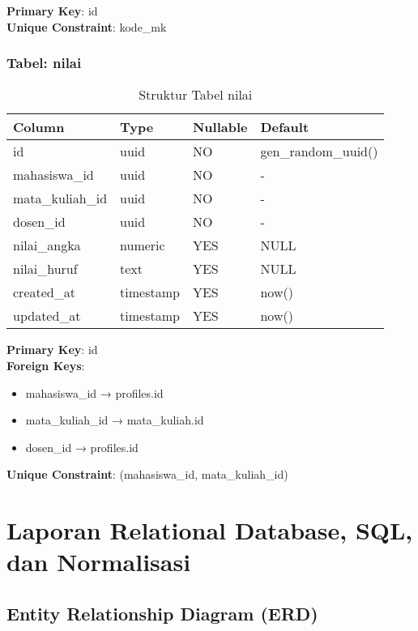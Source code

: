 \documentclass[12pt,a4paper]{article}
\begin{document}
\textbf{Primary Key}: id\\
\textbf{Unique Constraint}: kode\_mk

\subsubsection{Tabel: nilai}

\begin{table}[H]
\centering
\begin{tabular}{|l|l|l|l|}
\hline
\textbf{Column} & \textbf{Type} & \textbf{Nullable} & \textbf{Default} \\
\hline
id & uuid & NO & gen\_random\_uuid() \\
mahasiswa\_id & uuid & NO & - \\
mata\_kuliah\_id & uuid & NO & - \\
dosen\_id & uuid & NO & - \\
nilai\_angka & numeric & YES & NULL \\
nilai\_huruf & text & YES & NULL \\
created\_at & timestamp & YES & now() \\
updated\_at & timestamp & YES & now() \\
\hline
\end{tabular}
\caption{Struktur Tabel nilai}
\end{table}

\textbf{Primary Key}: id\\
\textbf{Foreign Keys}:
\begin{itemize}
    \item mahasiswa\_id → profiles.id
    \item mata\_kuliah\_id → mata\_kuliah.id
    \item dosen\_id → profiles.id
\end{itemize}
\textbf{Unique Constraint}: (mahasiswa\_id, mata\_kuliah\_id)

\newpage
\section{Laporan Relational Database, SQL, dan Normalisasi}

\subsection{Entity Relationship Diagram (ERD)}
\end{document}

